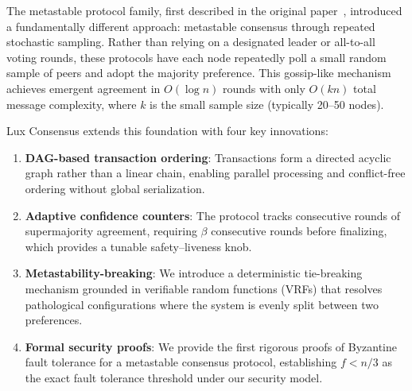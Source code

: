 \documentclass[11pt,a4paper]{article}
\begin{document}
The metastable protocol family, first described in the original
paper~\cite{rocket2019wave}, introduced a fundamentally different approach: metastable
consensus through repeated stochastic sampling. Rather than relying on a designated leader
or all-to-all voting rounds, these protocols have each node repeatedly poll a small random
sample of peers and adopt the majority preference. This gossip-like mechanism achieves
emergent agreement in $O(\log n)$ rounds with only $O(kn)$ total message complexity, where
$k$ is the small sample size (typically 20--50 nodes).

Lux Consensus extends this foundation with four key innovations:
\begin{enumerate}
\item \textbf{DAG-based transaction ordering}: Transactions form a directed acyclic graph
rather than a linear chain, enabling parallel processing and conflict-free ordering without
global serialization.
\item \textbf{Adaptive confidence counters}: The protocol tracks consecutive rounds of
supermajority agreement, requiring $\beta$ consecutive rounds before finalizing, which
provides a tunable safety--liveness knob.
\item \textbf{Metastability-breaking}: We introduce a deterministic tie-breaking mechanism
grounded in verifiable random functions (VRFs) that resolves pathological configurations
where the system is evenly split between two preferences.
\item \textbf{Formal security proofs}: We provide the first rigorous proofs of Byzantine
fault tolerance for a metastable consensus protocol, establishing $f < n/3$ as the exact fault
tolerance threshold under our security model.
\end{enumerate}
\end{document}
